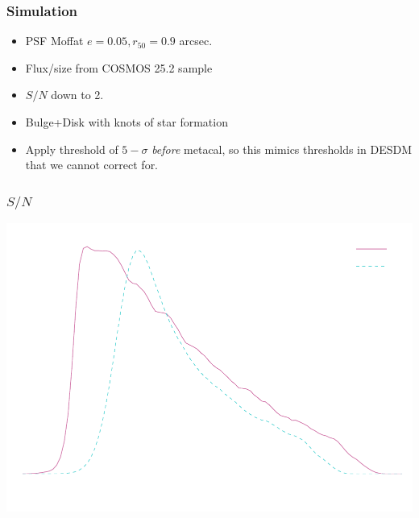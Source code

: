 \documentclass{beamer}
\newcommand{\snr}{$S/N$}
\begin{document}
\frame
{

    \frametitle{Simulation}

    \begin{itemize}
        \item PSF Moffat $e=0.05, r_{50} = 0.9$ arcsec.
        \item Flux/size from COSMOS 25.2 sample
        \item $S/N$ down to 2.
        \item Bulge+Disk with knots of star formation
        \item Apply threshold of $5-\sigma$ {\em before} metacal, so this
            mimics thresholds in DESDM that we cannot correct for.
    \end{itemize}


}

\frame
{
    \frametitle{\snr}
 
    \begin{center}
        \includegraphics[width=\textwidth]{run-bdj03mcal01-s2n-inv.pdf}
        \newline
    \end{center}



}
\end{document}
